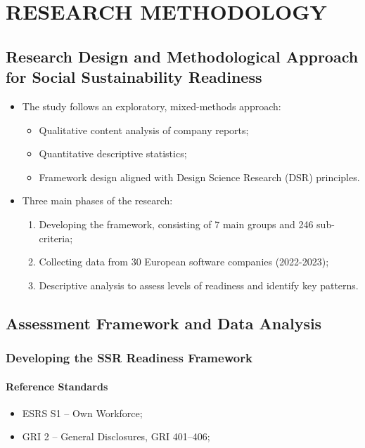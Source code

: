 \chapter{RESEARCH METHODOLOGY}

\section{Research Design and Methodological Approach for Social Sustainability Readiness}

\begin{itemize}
    \item The study follows an exploratory, mixed-methods approach:
    \begin{itemize}
        \item Qualitative content analysis of company reports;
        \item Quantitative descriptive statistics;
        \item Framework design aligned with Design Science Research (DSR) principles.
    \end{itemize}
\end{itemize}

\begin{itemize}
    \item Three main phases of the research:
    \begin{enumerate}
        \item Developing the framework, consisting of 7 main groups and 246 sub-criteria;
        \item Collecting data from 30 European software companies (2022-2023);
        \item Descriptive analysis to assess levels of readiness and identify key patterns.
    \end{enumerate}
\end{itemize}



\section{Assessment Framework and Data Analysis}
\subsection{Developing the SSR Readiness Framework}
\subsubsection{Reference Standards}
\begin{itemize}
    \item ESRS S1 -- Own Workforce;
    \item GRI 2 -- General Disclosures, GRI 401--406;
\end{itemize}

